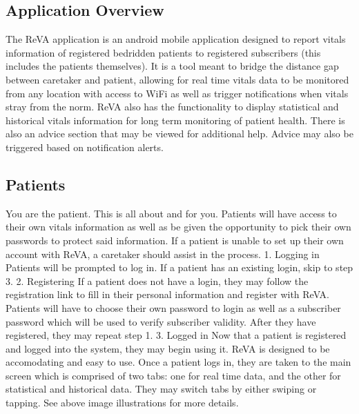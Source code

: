 \subsection{Application Overview}
The ReVA application is an android mobile application designed to report vitals information of registered bedridden patients to registered subscribers (this includes the patients themselves). It is a tool meant to bridge the distance gap between caretaker and patient, allowing for real time vitals data to be monitored from any location with access to WiFi as well as trigger notifications when vitals stray from the norm. ReVA also has the functionality to display statistical and historical vitals information for long term monitoring of patient health. There is also an advice section that may be viewed for additional help. Advice may also be triggered based on notification alerts. 

\subsection{Patients}
	You are the patient. This is all about and for you. Patients will have access to their own vitals information as well as be given the opportunity to pick their own passwords to protect said information. If a patient is unable to set up their own account with ReVA, a caretaker should assist in the process. 
	1. Logging in
		Patients will be prompted to log in. If a patient has an existing login, skip to step 3. 
	2. Registering
		If a patient does not have a login, they may follow the registration link to fill in their personal information and 			register with ReVA. Patients will have to choose their own password to login as well as a subscriber password which will 		 be used to verify subscriber validity. After they have registered, they may repeat step 1. 
	3. Logged in
		Now that a patient is registered and logged into the system, they may begin using it. 
	ReVA is designed to be accomodating and easy to use. Once a patient logs in, they are taken to the main screen which is comprised of two tabs: one for real time data, and the other for statistical and historical data. They may switch tabs by either swiping or tapping. See above image illustrations for more details. 
	
